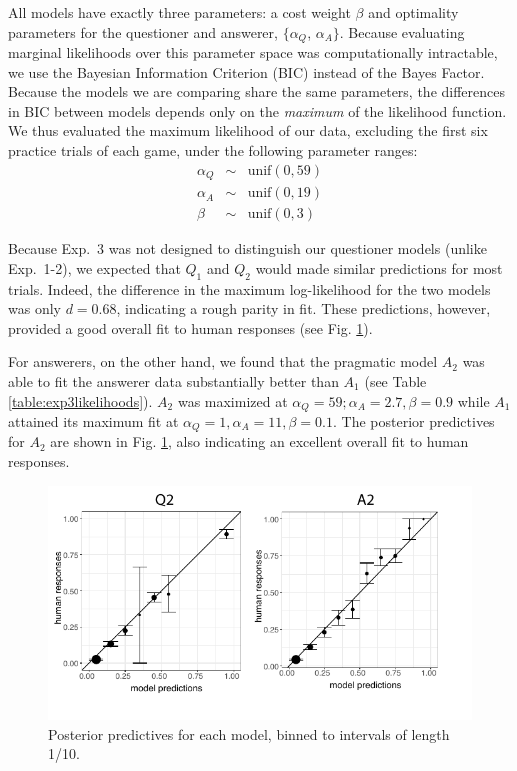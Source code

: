 \documentclass[11pt, floatsintext]{apa6}
\begin{document}
All models have exactly three parameters: a cost weight $\beta$ and optimality parameters for the questioner and answerer, $\{\alpha_Q$, $\alpha_A\}$.
Because evaluating marginal likelihoods over this parameter space was computationally intractable, we use the Bayesian Information Criterion (BIC) instead of the Bayes Factor. 
Because the models we are comparing share the same parameters, the differences in BIC between models depends only on the \emph{maximum} of the likelihood function.
We thus evaluated the maximum likelihood of our data, excluding the first six practice trials of each game, under the following parameter ranges:
$$
\begin{array}{rcl}
\alpha_Q & \sim & \textrm{unif}(0, 59) \\
\alpha_A & \sim & \textrm{unif}(0, 19) \\
\beta & \sim & \textrm{unif}(0, 3)
\end{array}
$$

Because Exp.~3 was not designed to distinguish our questioner models (unlike Exp.~1-2), we expected that $Q_1$ and $Q_2$ would made similar predictions for most trials. 
Indeed, the difference in the maximum log-likelihood for the two models was only $d=0.68$, indicating a rough parity in fit.
These predictions, however, provided a good overall fit to human responses (see Fig. \ref{fig:exp3predictives}).

For answerers, on the other hand, we found that the pragmatic model $A_2$ was able to fit the answerer data substantially better than $A_1$ (see Table \ref{table:exp3likelihoods}).
$A_2$ was maximized at $\alpha_Q = 59; \alpha_A = 2.7, \beta = 0.9$ while $A_1$ attained its maximum fit at $\alpha_Q = 1, \alpha_A = 11, \beta = 0.1$. 
The posterior predictives for $A_2$ are shown in  Fig. \ref{fig:exp3predictives}, also indicating an excellent overall fit to human responses.

\begin{figure}[t!]
\begin{center}
\includegraphics[scale = .8]{Exp3/predictives.pdf}
\end{center}
\caption{Posterior predictives for each model, binned to intervals of length 1/10.}
\label{fig:exp3predictives}
\end{figure}
\end{document}
